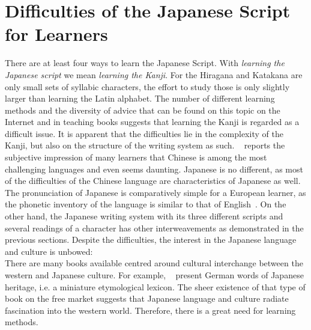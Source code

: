\section{Difficulties of the Japanese Script for Learners}
\label{sec:japanesedifficulties}


There are at least four ways to learn the Japanese Script. 
With \emph{learning the Japanese script} we mean \emph{learning the Kanji}.
For the Hiragana and Katakana are only small sets of syllabic characters,
the effort to study those is only slightly larger than learning the Latin 
alphabet. The number of different learning methods and the diversity of advice
that can be found on this topic on the Internet and in teaching books suggests
that learning the Kanji is regarded as a difficult issue.
It is apparent that the difficulties lie in the complexity of the Kanji, 
but also on the structure of the writing system as such. 
~\citeyear{Stahlmann2004} reports the subjective 
impression of many learners that Chinese is among the most challenging languages
and even seems daunting. Japanese is no different, as most of the difficulties 
of the Chinese language are characteristics of Japanese as well. 
The pronunciation of Japanese is comparatively simple for a European learner, 
as the phonetic inventory of the language is similar to that of 
English~. On the other hand, the Japanese writing 
system with its three different scripts and several readings of a character 
has other interweavements as demonstrated in the previous sections.
Despite the difficulties, the interest in the Japanese language and 
culture is unbowed:\\
There are many books available centred around cultural interchange between
the western and Japanese culture. For example, 
~\citeyear{Haschke2008} present
German words of Japanese heritage, i.e. a miniature etymological lexicon.
The sheer existence of that type of book on the free market suggests that 
Japanese language and culture radiate fascination into the western world.
Therefore, there is a great need for learning methods.

